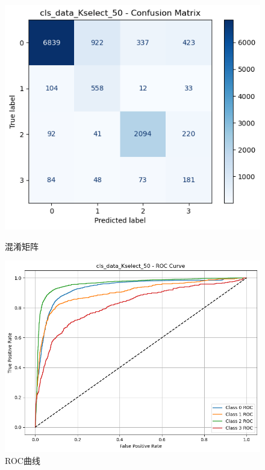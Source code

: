 \documentclass[10pt]{article}
\begin{document}
\begin{figure}[H]
\centering
\begin{minipage}[t]{0.45\textwidth}
  \centering
  \includegraphics[width=\linewidth]{cls_nb_50s.png}
  \caption{混淆矩阵}
  \label{fig:59}
\end{minipage}
\hfill
\begin{minipage}[t]{0.52\textwidth}
  \centering
  \includegraphics[width=\linewidth]{cls_nb_50s2.png}
  \caption{ROC曲线}
  \label{fig:60}
\end{minipage}
\end{figure}
\end{document}
